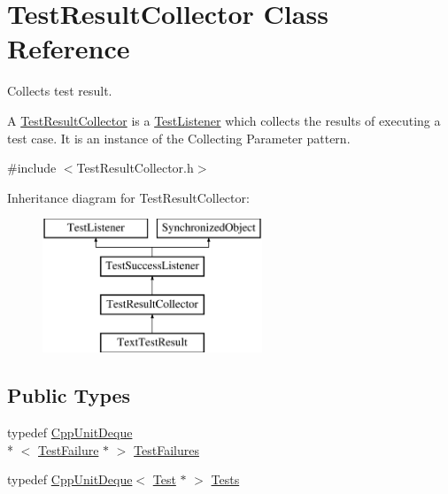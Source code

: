 \hypertarget{class_test_result_collector}{\section{Test\-Result\-Collector Class Reference}
\label{class_test_result_collector}
}


Collects test result.

A \hyperlink{class_test_result_collector}{Test\-Result\-Collector} is a \hyperlink{class_test_listener}{Test\-Listener} which collects the results of executing a test case. It is an instance of the Collecting Parameter pattern.  




{\ttfamily \#include $<$Test\-Result\-Collector.\-h$>$}

Inheritance diagram for Test\-Result\-Collector\-:\begin{figure}[H]
\begin{center}
\leavevmode
\includegraphics[height=4.000000cm]{class_test_result_collector}
\end{center}
\end{figure}
\subsection*{Public Types}
\begin{DoxyCompactItemize}
\item 
typedef \hyperlink{_cpp_unit_deque_8h_a3425728ebb9dff4afd4dcb7e6f270905}{Cpp\-Unit\-Deque}\\*
$<$ \hyperlink{class_test_failure}{Test\-Failure} $\ast$ $>$ \hyperlink{class_test_result_collector_a8ae051e883095aee10d9f777664fe8af}{Test\-Failures}
\item 
typedef \hyperlink{_cpp_unit_deque_8h_a3425728ebb9dff4afd4dcb7e6f270905}{Cpp\-Unit\-Deque}$<$ \hyperlink{class_test}{Test} $\ast$ $>$ \hyperlink{class_test_result_collector_a6ab73f8a52311857afa98a1ef049e30a}{Tests}
\end{DoxyCompactItemize}
